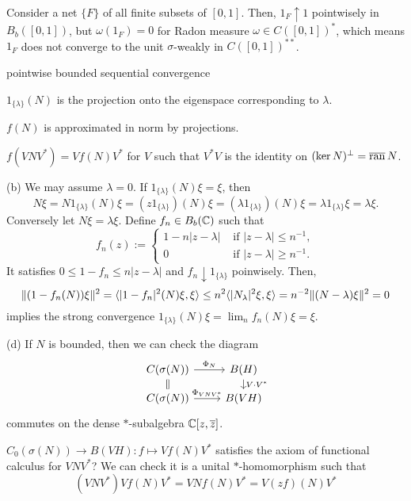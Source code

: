 \documentclass{../../large}
\begin{document}
\begin{prb}
Consider a net $\{F\}$ of all finite subsets of $[0,1]$.
Then, $1_F\uparrow1$ pointwisely in $B_b([0,1])$, but $\omega(1_F)=0$ for Radon measure $\omega\in C([0,1])^*$, which means $1_F$ does not converge to the unit $\sigma$-weakly in $C([0,1])^{**}$.
\begin{parts}
\item pointwise bounded sequential convergence
\item $1_{\{\lambda\}}(N)$ is the projection onto the eigenspace corresponding to $\lambda$.
\item $f(N)$ is approximated in norm by projections.
\item $f(VNV^*)=Vf(N)V^*$ for $V$ such that $V^*V$ is the identity on $(\ker N)^\perp=\overline{\operatorname{ran}}\,N$.
\end{parts}
\end{prb}
\begin{pf}
(b)
We may assume $\lambda=0$.
If $1_{\{\lambda\}}(N)\xi=\xi$, then
\[N\xi=N1_{\{\lambda\}}(N)\xi=(z1_{\{\lambda\}})(N)\xi=(\lambda1_{\{\lambda\}})(N)\xi=\lambda1_{\{\lambda\}}\xi=\lambda\xi.\]
Conversely let $N\xi=\lambda\xi$.
Define $f_n\in B_b(\mathbb{C})$ such that
\[f_n(z):=\begin{cases}
1-n|z-\lambda|&\text{ if }|z-\lambda|\le n^{-1},\\
0&\text{ if }|z-\lambda|\ge n^{-1}.
\end{cases}\]
It satisfies $0\le1-f_n\le n|z-\lambda|$ and $f_n\downarrow 1_{\{\lambda\}}$ poinwisely.
Then,
\[\|(1-f_n(N))\xi\|^2=\langle|1-f_n|^2(N)\xi,\xi\rangle\le n^2\langle|N_\lambda|^2\xi,\xi\rangle=n^{-2}\|(N-\lambda)\xi\|^2=0\]
implies the strong convergence $1_{\{\lambda\}}(N)\xi=\lim_nf_n(N)\xi=\xi$.

(d)
If $N$ is bounded, then we can check the diagram
\[\begin{tikzcd}[row sep=small]
C(\sigma(N))\ar[equals]{d}\ar{r}{\Phi_N} & B(H) \ar{d}{V\cdot V^*}\\
C(\sigma(N))\ar{r}{\Phi_{VNV^*}} & B(VH)
\end{tikzcd}\]
commutes on the dense $*$-subalgebra $\mathbb{C}[z,\overline z]$.

$C_0(\sigma(N))\to B(VH):f\mapsto Vf(N)V^*$ satisfies the axiom of functional calculus for $VNV^*$?
We can check it is a unital $*$-homomorphism such that
\[(VNV^*)Vf(N)V^*=VNf(N)V^*=V(zf)(N)V^*\]
\end{pf}
\end{document}
